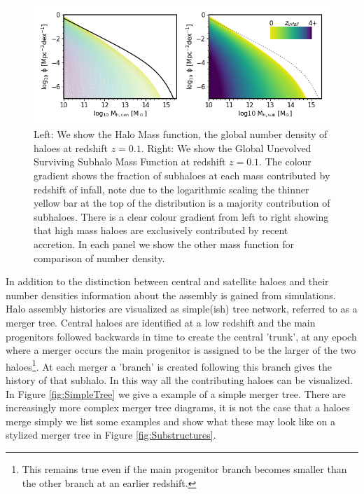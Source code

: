 \begin{figure}[h]
	\centering
	\includegraphics[width = \linewidth]{Figures/Chapter1/SubHaloes_byz.png}
    \caption{Left: We show the Halo Mass function, the global number density of haloes at redshift $z=0.1$. Right: We show the Global Unevolved Surviving Subhalo Mass Function at redshift $z=0.1$. The colour gradient shows the fraction of subhaloes at each mass contributed by redshift of infall, note due to the logarithmic scaling the thinner yellow bar at the top of the distribution is a majority contribution of subhaloes. There is a clear colour gradient from left to right showing that high mass haloes are exclusively contributed by recent accretion. In each panel we show the other mass function for comparison of number density.}
	\label{fig:SubHaloes_byz}
\end{figure}

In addition to the distinction between central and satellite haloes and their number densities information about the assembly is gained from simulations. Halo assembly histories are visualized as simple(ish) tree network, referred to as a merger tree. Central haloes are identified at a low redshift and the main progenitors followed backwards in time to create the central 'trunk', at any epoch where a merger occurs the main progenitor is assigned to be the larger of the two haloes\footnote{This remains true even if the main progenitor branch becomes smaller than the other branch at an earlier redshift.}. At each merger a 'branch' is created following this branch gives the history of that subhalo. In this way all the contributing haloes can be visualized. In Figure \ref{fig:SimpleTree} we give a example of a simple merger tree. There are increasingly more complex merger tree diagrams, it is not the case that a haloes merge simply we list some examples and show what these may look like on a stylized merger tree in Figure \ref{fig:Substructures}.

